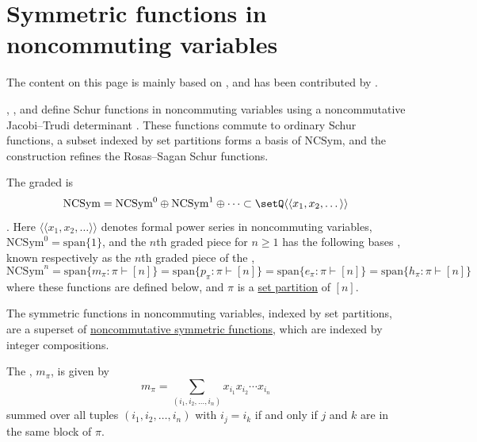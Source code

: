 



\section[schurInNonCom]{Symmetric functions in noncommuting variables}


The content on this page is mainly based on \cite{AliniaeifardLiWilligenburg2022},
and has been contributed by .

, , and
 define Schur
functions in noncommuting variables using a noncommutative Jacobi--Trudi
determinant \cite{AliniaeifardLiWilligenburg2022}.  These functions commute
to ordinary Schur functions, a subset indexed by set partitions forms a basis
of $\mathrm{NCSym}$, and the construction refines the Rosas--Sagan Schur
functions.



The graded 
\label{NCSymHopfAlgebra} is
\[
\mathrm{NCSym} = \mathrm{NCSym}^0 \oplus \mathrm{NCSym}^1 \oplus \dotsb
\subset
\setQ \langle \langle x_1, x_2, \dotsc \rangle\rangle
\].
Here $\langle\langle x_1,x_2,\dotsc\rangle\rangle$ denotes formal power
series in noncommuting variables, $\mathrm{NCSym}^0=\mathrm{span}\{1\}$,
and the $n$th graded piece
for $n\geq 1$ has the following bases \cite{RosasBruce2006}, known respectively as
the $n$th graded piece of the
\label{NCSymStandardBases},
\[
\mathrm{NCSym}^n = \mathrm{span}\{ m_\pi : \pi\vdash [n]\}
= \mathrm{span}\{ p_\pi : \pi\vdash [n]\}
= \mathrm{span}\{ e_\pi : \pi\vdash [n]\}
= \mathrm{span}\{  {h_\pi} : \pi\vdash [n]\}
\]
where these functions are defined below, and $\pi$ is a
\hyperref[setPartitions]{set partition} of $[n]$.

The symmetric functions in noncommuting variables, indexed by set partitions,
are a superset of \hyperref[nonComFunctions]{noncommutative symmetric
functions}, which are indexed by integer compositions.



The 
\label{NCSymMonomialBasis}, $m_\pi$, is given by
\[
m_\pi =
\sum _{(i_1, i_2, \dotsc, i_n)} x_{i_1}x_{i_2} \dotsm x_{i_n}
\]
summed over all tuples $(i_1, i_2, \dotsc, i_n)$ with $i_j=i_k$
if and only if $j$ and $k$ are in the same block of $\pi$.

